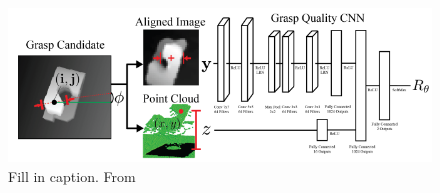 \begin{figure}[t!]
    \includegraphics[width=0.99\columnwidth]{figs/dexnet.PNG}
\caption{Fill in caption. From \cite{mahler2017dex}} \label{fig:dexnet_network}
\end{figure}

